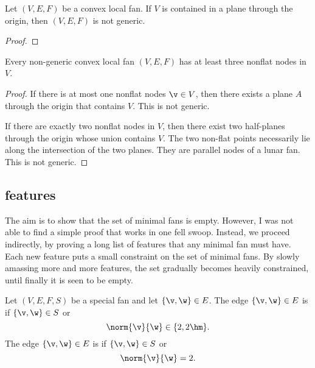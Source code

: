 \begin{lemma}[]
Let $(V,E,F)$ be a convex local fan.  If $V$ is contained in a plane
through the origin, then $(V,E,F)$ is not generic.
\end{lemma}

\begin{proof}
\end{proof}

\begin{lemma}[]\label{lemma:3-nonflat}
Every non-generic convex local fan $(V,E,F)$ has at least three nonflat
nodes in $V$.
\end{lemma}

\begin{proof}
If there is at most one nonflat nodes $\v\in V$, then there exists
a plane $A$ through the origin that contains $V$.  This is not
generic.

If there are exactly two nonflat nodes in $V$, then
there exist two half-planes through the origin whose union contains
$V$.  The two non-flat points necessarily lie along the intersection
of the two planes.  They are parallel nodes of a lunar fan.
This is not generic.
\end{proof}

\subsection{features}

\begin{summary}  The aim is to show that the set of minimal fans is empty.  However,
I was not able to find a simple proof that works in one fell swoop.  Instead, we proceed indirectly,
by proving a long list of features that any minimal fan must have.  Each new feature
puts a small constraint on the set of minimal fans.  By slowly amassing more and more
features, the set gradually becomes heavily constrained, until finally it is seen to be empty.
\end{summary}


\begin{definition}
 Let $(V,E,F,S)$ be a special fan
and let $\{\v,\w\}\in E$.  The edge $\{\v,\w\}\in E$ is
 if $\{\v,\w\}\in S$ or
\begin{displaymath}
\norm{\v}{\w}\in\{2,2\hm\}.
\end{displaymath}
The edge $\{\v,\w\}\in E$ is  if $\{\v,\w\}\in S$ or
\begin{displaymath}
\norm{\v}{\w}=2.
\end{displaymath}
\end{definition}

